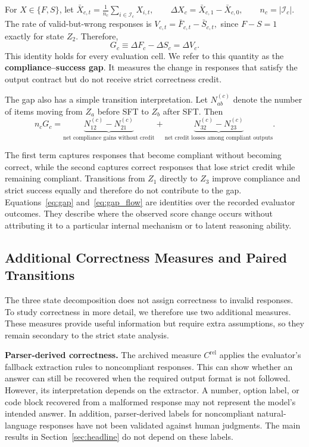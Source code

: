 \documentclass{article}
\begin{document}
For \(X\in\{F,S\}\), let
$\bar X_{c,t}=\frac{1}{n_c}\sum_{i\in\mathcal{I}_c}X_{i,t},
\qquad
\Delta X_c=\bar X_{c,1}-\bar X_{c,0},
\qquad
n_c=|\mathcal{I}_c|$.
The rate of valid-but-wrong responses is
$V_{c,t}=\bar F_{c,t}-\bar S_{c,t},$
since \(F-S=1\) exactly for state \(Z_2\). Therefore,
\begin{equation}
G_c\equiv\Delta F_c-\Delta S_c=\Delta V_c.
\label{eq:gap}
\end{equation}
This identity holds for every evaluation cell. We refer to this quantity as the \textbf{compliance--success gap}. It measures the change in responses that satisfy the output contract but do not receive strict correctness credit.

The gap also has a simple transition interpretation. Let \(N^{(c)}_{ab}\) denote the number of items moving from \(Z_a\) before SFT to \(Z_b\) after SFT. Then
\begin{equation} 
n_cG_c = \underbrace{N^{(c)}_{12}-N^{(c)}_{21}}_{\text{net compliance gains without credit}} + \underbrace{N^{(c)}_{32}-N^{(c)}_{23}}_{\text{net credit losses among compliant outputs}}. 
\label{eq:gap_flow}
\end{equation}

The first term captures responses that become compliant without becoming correct, while the second captures correct responses that lose strict credit while remaining compliant. Transitions from \(Z_1\) directly to \(Z_3\) improve compliance and strict success equally and therefore do not contribute to the gap.
Equations~\eqref{eq:gap} and~\eqref{eq:gap_flow} are identities over the recorded evaluator outcomes. They describe where the observed score change occurs without attributing it to a particular internal mechanism or to latent reasoning ability.

\vspace{-2mm}
\subsection{Additional Correctness Measures and Paired Transitions}
\label{sec:instruments}
\vspace{-1mm}
The three state decomposition does not assign correctness to invalid responses. To study correctness in more detail, we therefore use two additional measures. These measures provide useful information but require extra assumptions, so they remain secondary to the strict state analysis.

\noindent\textbf{Parser-derived correctness.}
The archived measure $C^{\mathrm{rel}}$ applies the evaluator's fallback extraction rules to noncompliant responses. This can show whether an answer can still be recovered when the required output format is not followed. However, its interpretation depends on the extractor. A number, option label, or code block recovered from a malformed response may not represent the model's intended answer. In addition, parser-derived labels for noncompliant natural-language responses have not been validated against human judgments. The main results in Section~\ref{sec:headline} do not depend on these labels.
\end{document}
